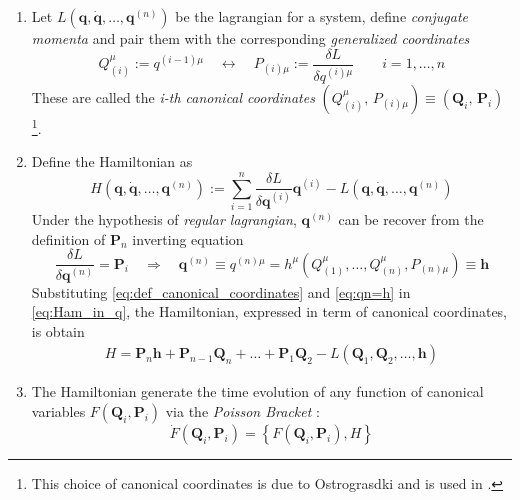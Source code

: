 \begin{enumerate}
  \item Let $L(\bm{q}, \dot{\bm{q}}, \ldots, \bm{q}^{(n)})$ be the lagrangian
    for a system, define \emph{conjugate momenta} and pair them with the
    corresponding \emph{generalized coordinates}
    \begin{equation} \label{eq:def_canonical_coordinates}
      Q_{(i)}^{\mu} := q^{(i-1)\mu}
      \quad \leftrightarrow \quad
      P_{(i)\mu} := \frac{\delta L}{\delta q^{(i)\mu}}
      \qquad i = 1, \ldots, n
    \end{equation}
    These are called the \emph{i-th canonical coordinates}
    $(Q_{(i)}^{\mu}, \, P_{(i)\mu}) \equiv (\bm{Q}_{i}, \, \bm{P}_{i})$
    \footnote{
      This choice of canonical coordinates is due to Ostrograsdki and is used
      in \cite{Smilga17, Chen13}.
    }.

  \item Define the Hamiltonian as
    \begin{equation} \label{eq:Ham_in_q}
      H(\bm{q}, \dot{\bm{q}}, \ldots, \bm{q}^{(n)}) :=
      \sum_{i=1}^{n} \frac{\delta L}{\delta \bm{q}^{(i)}} \bm{q}^{(i)} -
      L(\bm{q}, \dot{\bm{q}}, \ldots, \bm{q}^{(n)})
    \end{equation}
    Under the hypothesis of \emph{regular lagrangian}, $\bm{q}^{(n)}$ can be
    recover from the definition of $\bm{P}_n$ inverting equation
    \begin{equation} \label{eq:qn=h}
      \frac{\delta L}{\delta \bm{q}^{(n)}} = \bm{P}_i
      \quad \Rightarrow \quad
      \bm{q}^{(n)} \equiv q^{(n)\mu} =
      h^{\mu}(Q^{\mu}_{(1)}, \ldots, Q^{\mu}_{(n)}, P_{(n)\mu}) \equiv \bm{h}
    \end{equation}
    Substituting \eqref{eq:def_canonical_coordinates} and \eqref{eq:qn=h} in
    \eqref{eq:Ham_in_q}, the Hamiltonian, expressed in term of canonical
    coordinates, is obtain
    \begin{align}
      H = \bm{P}_n \bm{h} + \bm{P}_{n-1} \bm{Q}_n + \ldots + \bm{P}_1 \bm{Q}_2
          - L(\bm{Q}_1, \bm{Q}_2, \ldots, \bm{h})
    \end{align}

  \item The Hamiltonian generate the time evolution of any function of canonical
    variables $F(\bm{Q}_i, \bm{P}_i)$ via the \emph{Poisson Bracket}
    \cite{Chen13}:
    \begin{equation}
      \dot{F}(\bm{Q}_i, \bm{P}_i) = \left\{
        F(\bm{Q}_i, \bm{P}_i), H
      \right\}
    \end{equation}


\end{enumerate}
